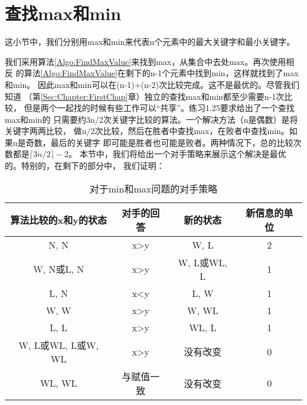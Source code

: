 \section{查找max和min}
这小节中，我们分别用max和min来代表n个元素中的最大关键字和最小关键字。

我们采用算法\ref{Algo:FindMaxValue}来找到max，从集合中去处max。再次使用相反
的算法\ref{Algo:FindMaxValue}在剩下的n-1个元素中找到min，这样就找到了max和min。
因此max和min可以在(n-1)+(n-2)次比较完成。这不是最优的。尽管我们知道
（第\ref{Sec:Chapter:FirstChap}章）独立的查找max和min都至少需要n-1次比较，
但是两个一起找的时候有些工作可以“共享”。练习1.25要求给出了一个查找max和min的
只需要约3n/2次关键字比较的算法。一个解决方法（n是偶数）是将关键字两两比较，
做n/2次比较，然后在胜者中查找max，在败者中查找min。如果n是奇数，最后的关键字
即可能是胜者也可能是败者。两种情况下，总的比较次数都是$\lceil3n/2\rceil -2$。
本节中，我们将给出一个对手策略来展示这个解决是最优的。特别的，在剩下的部分中，
我们证明：

\begin{table}
\centering
\begin{tabular}{cccc}
\hline
算法比较的x和y的状态    &对手的回答  &新的状态    &新信息的单位\\
\hline
N, N                &x>y     &W, L         &2 \\
W, N或L, N          &x>y     &W, L或WL, L  &1 \\
L, N                &x<y     &L, W         &1 \\
W, W                &x>y     &W, WL        &1 \\
L, L                &x>y     &WL, L        &1 \\
W, L或WL, L或W, WL  &x>y     &没有改变     &0 \\
WL, WL              &与赋值一致  &没有改变    &0\\
\hline
\end{tabular}
\caption{对于min和max问题的对手策略}
\label{Table:AdversaryArgumentsOfminAndmax} \centering
\end{table}

